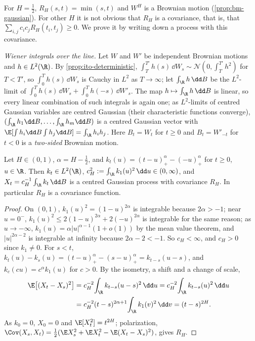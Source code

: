 For $H=\frac12$, $R_H(s,t)=\min(s,t)$ and $W^H$ is a Brownian motion (\cref{prop:bm-gaussian}). For
other $H$ it is not obvious that $R_H$ is a covariance, that is, that
$\sum_{i,j}c_ic_jR_H(t_i,t_j)\ge0$. We prove it by writing down a process with this covariance.

\emph{Wiener integrals over the line.} Let $W$ and $W'$ be independent Brownian motions and
$h\in L^2(\R)$. By \cref{prop:ito-deterministic}, $\int_T^{T'}h(s)\,\dd W_s\sim\mathcal N(0,\int_T^{T'}h^2)$
for $T<T'$, so $\int_0^Th(s)\,\dd W_s$ is Cauchy in $L^2$ as $T\to\infty$; let
$\int_\R h\,\dd B$ be the $L^2$-limit of $\int_0^Th(s)\,\dd W_s+\int_0^Th(-s)\,\dd W'_s$. The map
$h\mapsto\int_\R h\,\dd B$ is linear, so every linear combination of such integrals is again one; as
$L^2$-limits of centred Gaussian variables are centred Gaussian (their characteristic functions
converge), $(\int_\R h_1\dd B,\dots,\int_\R h_m\dd B)$ is a centred Gaussian vector with
$\E[\int h_i\dd B\int h_j\dd B]=\int_\R h_ih_j$. Here $B_t=W_t$ for $t\ge0$ and $B_t=W'_{-t}$ for $t<0$ is a
\emph{two-sided} Brownian motion.

\begin{proposition}\label{prop:rv-mvn}
Let $H\in(0,1)$, $\alpha=H-\frac12$, and $k_t(u)=(t-u)_+^\alpha-(-u)_+^\alpha$ for $t\ge0$, $u\in\R$. Then
$k_t\in L^2(\R)$, $c_H^2:=\int_\R k_1(u)^2\,\dd u\in(0,\infty)$, and $X_t=c_H^{-1}\int_\R k_t\,\dd B$ is a centred
Gaussian process with covariance $R_H$. In particular $R_H$ is a covariance function.
\end{proposition}

\begin{proof}
On $(0,1)$, $k_1(u)^2=(1-u)^{2\alpha}$ is integrable because $2\alpha>-1$; near $u=0^-$, $k_1(u)^2\le
2(1-u)^{2\alpha}+2(-u)^{2\alpha}$ is integrable for the same reason; as $u\to-\infty$,
$k_1(u)=\alpha|u|^{\alpha-1}(1+o(1))$ by the mean value theorem, and $|u|^{2\alpha-2}$ is integrable at infinity
because $2\alpha-2<-1$. So $c_H<\infty$, and $c_H>0$ since $k_1\ne0$. For $s<t$,
$k_t(u)-k_s(u)=(t-u)_+^\alpha-(s-u)_+^\alpha=k_{t-s}(u-s)$, and $k_c(cu)=c^\alpha k_1(u)$ for $c>0$. By the
isometry, a shift and a change of scale,
\begin{align*}
  \E\big[(X_t-X_s)^2\big]&=c_H^{-2}\!\int_\R k_{t-s}(u-s)^2\,\dd u=c_H^{-2}\!\int_\R k_{t-s}(u)^2\,\dd u\\
  &=c_H^{-2}(t-s)^{2\alpha+1}\!\int_\R k_1(v)^2\,\dd v=(t-s)^{2H} .
\end{align*}
As $k_0=0$, $X_0=0$ and $\E[X_t^2]=t^{2H}$; polarization,
$\Cov(X_s,X_t)=\frac12(\E X_s^2+\E X_t^2-\E(X_t-X_s)^2)$, gives $R_H$.
\end{proof}

